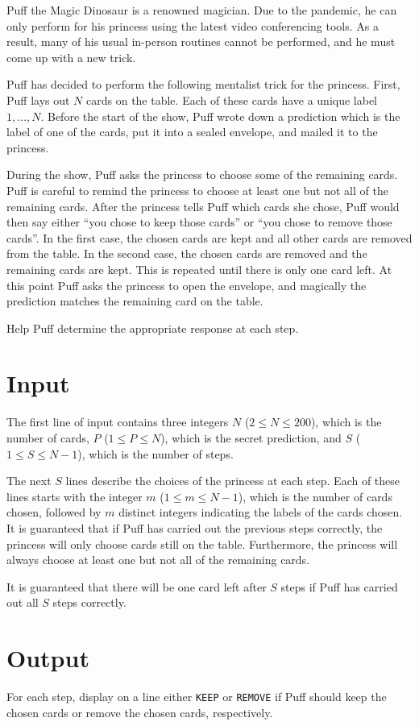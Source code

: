 
Puff the Magic Dinosaur is a renowned magician.  Due to the pandemic,
he can only perform for his princess using the latest video
conferencing tools.  As a result, many of his usual in-person routines
cannot be performed, and he must come up with a new trick.

Puff has decided to perform the following mentalist trick for the
princess.  First, Puff lays out $N$ cards on the table.  Each of these
cards have a unique label $1, \ldots, N$.  Before the start of the
show, Puff wrote down a prediction which is the label of one of the
cards, put it into a sealed envelope, and mailed it to the princess.

During the show, Puff asks the princess to choose some of the remaining 
cards.  Puff is careful to remind the princess to choose at least 
one but not all of the remaining cards.  
 After the princess tells Puff which cards she chose, 
Puff would then say either ``you chose to keep those cards'' or ``you 
chose to remove those cards''.  In the first case, the chosen cards are 
kept and all other cards are removed from the table.  In the second 
case, the chosen cards are removed and the remaining cards are kept.  
This is repeated until there is only one card left.  At this point Puff 
asks the princess to open the envelope, and magically the prediction 
matches the remaining card on the table.

Help Puff determine the appropriate response at each step.

\section*{Input}

The first line of input contains three integers $N$ ($2 \leq N \leq 200$),
which is the number of cards, $P$ ($1 \leq P \leq N$), which is the secret
prediction, and $S$ ($1 \leq S \leq N-1$), which is the number of steps.

The next $S$ lines describe the choices of the princess at each step.
Each of these lines starts with the integer $m$ ($1 \leq m \leq N-1$),
which is the number of cards chosen, followed by $m$ distinct integers
indicating the labels of the cards chosen.  It is guaranteed that if Puff has
carried out the previous steps correctly, the princess will only
choose cards still on the table.  Furthermore, the princess
will always choose at least one but not all of the remaining
cards.

It is guaranteed that there will be one card left after $S$ steps if
Puff has carried out all $S$ steps correctly.

\section*{Output}

For each step, display on a line either \texttt{KEEP} or \texttt{REMOVE}
if Puff should keep the chosen cards or remove
the chosen cards, respectively.
